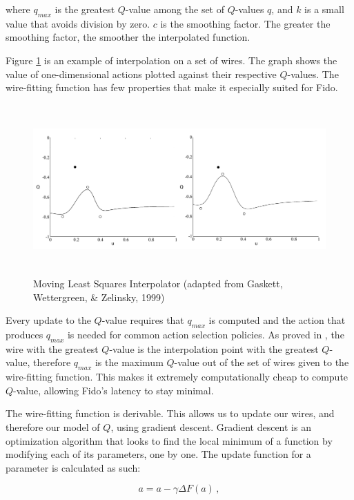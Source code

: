 \noindent
where $q_{max}$ is the greatest $Q$-value among the set of $Q$-values $q$, and $k$ is a small value that avoids division by zero.
$c$ is the smoothing factor.
The greater the smoothing factor, the smoother the interpolated function.


Figure \ref{fig::wirefitexample} is an example of interpolation on a set of wires.
The graph shows the value of one-dimensional actions plotted against their respective $Q$-values.
The wire-fitting function has few properties that make it especially suited for Fido.

\begin{figure}[ht]
   \centering
   \includegraphics[height=6.5cm]{Figures/WireFit.png}
	\caption{Moving Least Squares Interpolator (adapted from Gaskett, Wettergreen, \& Zelinsky, 1999)}
   \label{fig::wirefitexample}
\end{figure}

Every update to the $Q$-value requires that $q_{max}$ is computed and the action that produces $q_{max}$ is needed for common action selection policies.
As proved in \cite{baird}, the wire with the greatest $Q$-value is the interpolation point with the greatest $Q$-value, therefore $q_{max}$ is the maximum $Q$-value out of the set of wires given to the wire-fitting function.
This makes it extremely computationally cheap to compute $Q$-value, allowing Fido's latency to stay minimal.

The wire-fitting function is derivable.
This allows us to update our wires, and therefore our model of $Q$, using gradient descent.
Gradient descent is an optimization algorithm that looks to find the local minimum of a function by modifying each of its parameters, one by one.
The update function for a parameter is calculated as such:

\begin{equation}
	a = a - \gamma \Delta F(a)
	\,,
	\label{equ::wirefiterrorfunction}
\end{equation}

